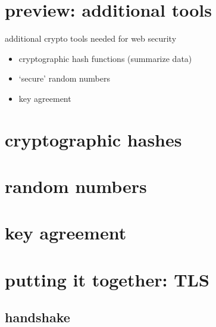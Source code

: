 \section{preview: additional tools}
\begin{frame}{additional crypto tools needed for web security}
    \begin{itemize}
    \item cryptographic hash functions (summarize data)
    \item `secure' random numbers
    \item key agreement
    \end{itemize}
\end{frame}

\section{cryptographic hashes}



% 

\section{random numbers}


\section{key agreement}


% 

\section{putting it together: TLS}


\subsection{handshake}


